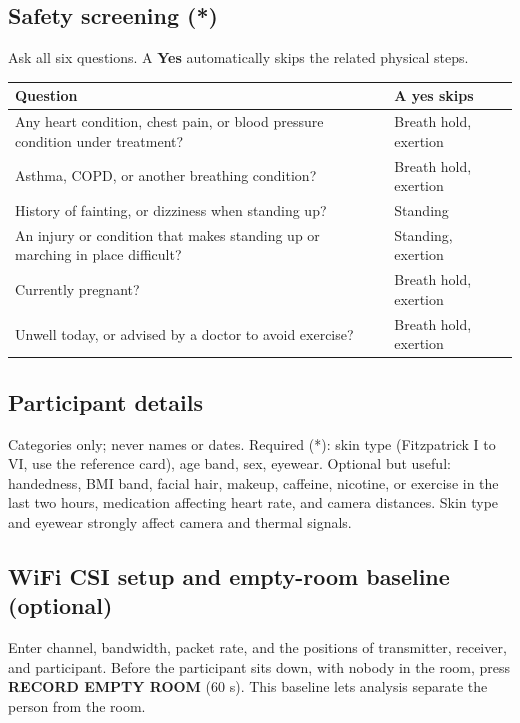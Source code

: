 \documentclass[11pt,a4paper]{article}
\newcommand{\ui}[1]{\textsf{\textbf{#1}}}
\begin{document}
\subsection{Safety screening (*)}
Ask all six questions. A \textbf{Yes} automatically skips the related physical steps.
\begin{longtable}{@{}p{8.8cm}p{5.8cm}@{}}
\toprule
\textbf{Question} & \textbf{A yes skips} \\
\midrule\endhead
Any heart condition, chest pain, or blood pressure condition under treatment? & Breath hold, exertion \\
Asthma, COPD, or another breathing condition? & Breath hold, exertion \\
History of fainting, or dizziness when standing up? & Standing \\
An injury or condition that makes standing up or marching in place difficult? & Standing, exertion \\
Currently pregnant? & Breath hold, exertion \\
Unwell today, or advised by a doctor to avoid exercise? & Breath hold, exertion \\
\bottomrule
\end{longtable}

\subsection{Participant details}
Categories only; never names or dates. Required (*): skin type (Fitzpatrick I to VI, use the reference card),
age band, sex, eyewear. Optional but useful: handedness, BMI band, facial hair, makeup, caffeine, nicotine, or exercise in
the last two hours, medication affecting heart rate, and camera distances. Skin type and eyewear strongly affect camera
and thermal signals.

\subsection{WiFi CSI setup and empty-room baseline (optional)}
Enter channel, bandwidth, packet rate, and the positions of transmitter, receiver, and participant. Before the
participant sits down, with nobody in the room, press \ui{RECORD EMPTY ROOM} (60 s). This baseline lets analysis
separate the person from the room.
\end{document}
